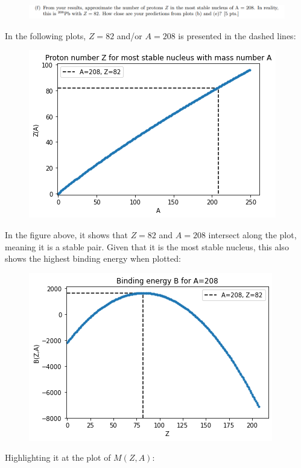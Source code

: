\documentclass[11pt]{article}
\theoremstyle{definition}
\begin{document}
\begin{figure}[H]
    \centering
    \includegraphics[scale = 0.5]{1f.png}
\end{figure}

In the following plots, $Z=82$ and/or $A=208$ is presented in the dashed lines:

\begin{figure}[H]
    \centering
    \includegraphics[scale = 0.75]{Z(A) with label.png}
\end{figure}

In the figure above, it shows that $Z=82$ and $A=208$ intersect along the plot, meaning it is a stable pair. Given that it is the most stable nucleus, this also shows the highest binding energy when plotted:

\begin{figure}[H]
    \centering
    \includegraphics[scale = 0.75]{binding energy lead with label.png}
\end{figure}

Highlighting it at the plot of $M(Z,A)$:
\end{document}
